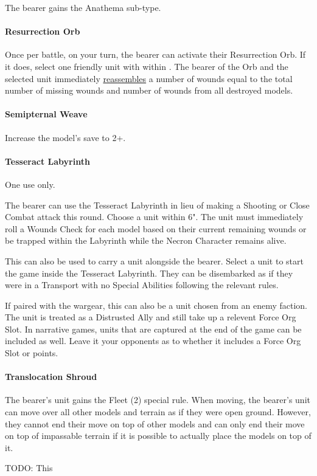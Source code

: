 The bearer gains the Anathema sub-type.

\paragraph*{Resurrection Orb} \label{Resurrection Orb}

Once per battle, on your turn, the bearer can activate their Resurrection Orb. If it does, select one friendly unit with  within . The bearer of the Orb and the selected unit immediately \textcolor{violet}{\hyperref[Reanimation Protocols]{reassembles}} a number of wounds equal to the total number of missing wounds and number of wounds from all destroyed models.

\paragraph*{Semipternal Weave} \label{Sempiternal Weave}

Increase the model's save to 2+.

\paragraph*{Tesseract Labyrinth} \label{Tesseract Labyrinth}

One use only.

The bearer can use the Tesseract Labyrinth in lieu of making a Shooting or Close Combat attack this round. Choose a unit within 6". The unit must immediately roll a Wounds Check for each model based on their current remaining wounds or be trapped within the Labyrinth while the Necron Character remains alive.

This can also be used to carry a unit alongside the bearer. Select a unit to start the game inside the Tesseract Labyrinth. They can be disembarked as if they were in a Transport with no Special Abilities following the relevant rules. 

If paired with the  wargear, this can also be a unit chosen from an enemy faction. The unit is treated as a Distrusted Ally and still take up a relevent Force Org Slot. In narrative games, units that are captured at the end of the game can be included as well. Leave it your opponents as to whether it includes a Force Org Slot or points.

\paragraph*{Translocation Shroud} \label{Translocation Shroud}

The bearer's unit gains the Fleet (2) special rule. When moving, the bearer's unit can move over all other models and terrain as if they were open ground. However, they cannot end their move on top of other models and can only end their move on top of impassable terrain if it is possible to actually place the models on top of it.

 \label{Artefacts of the Aeons}

TODO: This
